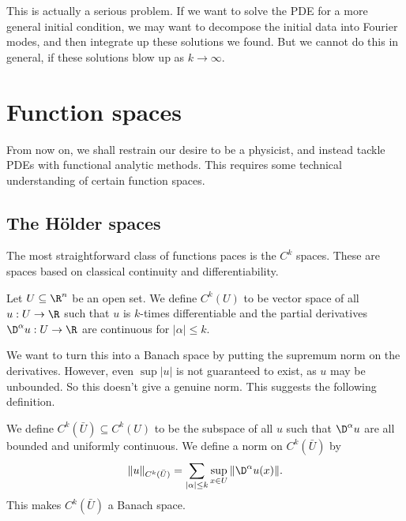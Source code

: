 \documentclass[a4paper]{article}
\begin{document}
This is actually a serious problem. If we want to solve the PDE for a more general initial condition, we may want to decompose the initial data into Fourier modes, and then integrate up these solutions we found. But we cannot do this in general, if these solutions blow up as $k \to \infty$.

\section{Function spaces}
From now on, we shall restrain our desire to be a physicist, and instead tackle PDEs with functional analytic methods. This requires some technical understanding of certain function spaces.

\subsection{The \texorpdfstring{H\"older}{Holder} spaces}
The most straightforward class of functions paces is the $C^k$ spaces. These are spaces based on classical continuity and differentiability.

\begin{defi}[$C^k$ spaces]
  Let $U \subseteq \R^n$ be an open set. We define $C^k(U)$ to be vector space of all $u: U \to \R$ such that $u$ is $k$-times differentiable and the partial derivatives $\D^\alpha u : U \to \R$ are continuous for $|\alpha| \leq k$.
\end{defi}
We want to turn this into a Banach space by putting the supremum norm on the derivatives. However, even $\sup |u|$ is not guaranteed to exist, as $u$ may be unbounded. So this doesn't give a genuine norm. This suggests the following definition.

\begin{defi}
  We define $C^k(\bar{U}) \subseteq C^k(U)$ to be the subspace of all $u$ such that $\D^\alpha u$ are all bounded and uniformly continuous. We define a norm on $C^k(\bar{U})$ by
  \[
    \|u\|_{C^k(\bar{U})} = \sum_{|\alpha| \leq k} \sup_{x \in U} \|\D^\alpha u(x)\|.
  \]
  This makes $C^k(\bar{U})$ a Banach space.
\end{defi}
\end{document}
